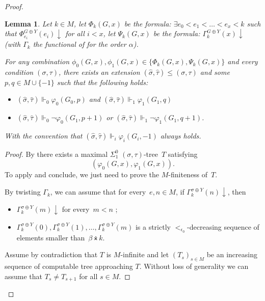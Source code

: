 \documentclass{article}
\numberwithin{theorem}{section}
\newtheorem{lemma}[theorem]{Lemma}
\newcommand{\ntimes}{\dottimes}
\begin{document}
\begin{proof}


\begin{lemma}\label{lem:sads-wf-forcing-wf-jump}
Let $k \in M$, let $\Phi_k(G,x)$ be the formula: $\exists e_0 < e_1 < \dots < e_{x} < k$ such that $\Phi_{e_i}^{G \oplus Y}(e_i) \downarrow$ for all $i < x$, let $\Psi_k(G,x)$ be the formula: $\Gamma^{G \oplus Y}_k(x) \downarrow$ (with $\Gamma_k$ the functional of  for the order $\alpha$).

For any combination $\phi_0(G,x), \phi_1(G,x) \in \{\Phi_k(G,x), \Psi_k(G,x)\}$ and every condition $(\sigma, \tau)$, there exists an extension  $(\hat \sigma, \hat \tau) \leq (\sigma, \tau)$ and some~$p,q \in M \cup \{-1\}$ such that the following holds:
\begin{itemize}
    \item $(\hat \sigma, \hat \tau) \Vdash_0 \varphi_0(G_0, p)$ and $(\hat \sigma, \hat \tau) \Vdash_1 \varphi_1(G_1,q)$
    \item $(\hat \sigma, \hat \tau) \Vdash_0 \neg \varphi_0(G_1,p+1)$ or $(\hat \sigma, \hat \tau) \Vdash_1 \neg \varphi_1(G_1,q+1)$.
\end{itemize}
With the convention that $(\hat \sigma, \hat \tau) \Vdash_i \varphi_i(G_i, -1)$ always holds.
\end{lemma}

\begin{proof}
By  there exists a maximal $\Sigma^0_1$ $(\sigma, \tau)$-tree~$T$ satisfying $$(\varphi_0(G, x), \varphi_1(G,x)).$$ To apply  and conclude, we just need to prove the $M$-finiteness of~$T$. 

By twisting $\Gamma_k$, we can assume that for every~$e, n \in M$, if $\Gamma^{\sigma \oplus Y}_k(n)\downarrow$, then
\begin{itemize}
    \item $\Gamma^{\sigma \oplus Y}_k(m)\downarrow$ for every~$m < n$ ;
    \item $\Gamma^{\sigma \oplus Y}_k(0), \Gamma^{\sigma \oplus Y}_k(1), \dots, \Gamma^{\sigma \oplus Y}_k(m)$ is a strictly $<_{\epsilon_0}$-decreasing sequence of elements smaller than~$\beta \ntimes k$.
\end{itemize}

Assume by contradiction that $T$ is $M$-infinite and let $(T_s)_{s \in M}$ be an increasing sequence of computable tree approaching $T$. Without loss of generality we can assume that $T_s \neq T_{s+1}$ for all $s \in M$.


\end{proof}
\end{proof}
\end{document}
